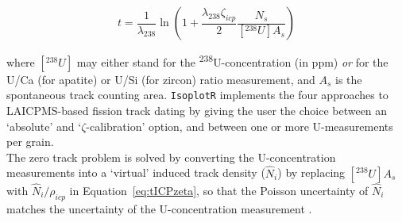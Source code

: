 \begin{refsection}
\begin{equation}
  t = \frac{1}{\lambda_{238}} \ln\left( 1 +
  \frac{\lambda_{238}\zeta_{icp}}{2} \frac{N_s}{[{}^{238}U] A_s} \right)
  \label{eq:tICPzeta}
\end{equation}

\noindent where $[{}^{238}U]$ may either stand for the
\textsuperscript{238}U-concentration (in ppm) \emph{or} for the U/Ca
(for apatite) or U/Si (for zircon) ratio measurement, and $A_s$ is the
spontaneous track counting area.  \texttt{IsoplotR} implements the
four approaches to LAICPMS-based fission track dating by giving the
user the choice between an `absolute' and `$\zeta$-calibration'
option, and between one or more U-measurements per grain.\\

The zero track problem is solved by converting the U-concentration
measurements into a `virtual' induced track density ($\hat{N}_i$) by
replacing $[{}^{238}U] A_s$ with $\hat{N}_i/\rho_{icp}$ in
Equation~\ref{eq:tICPzeta}, so that the Poisson uncertainty of
$\hat{N}_i$ matches the uncertainty of the U-concentration measurement
\citep{vermeesch2017}.

\printbibliography[heading=subbibliography]

\end{refsection}
